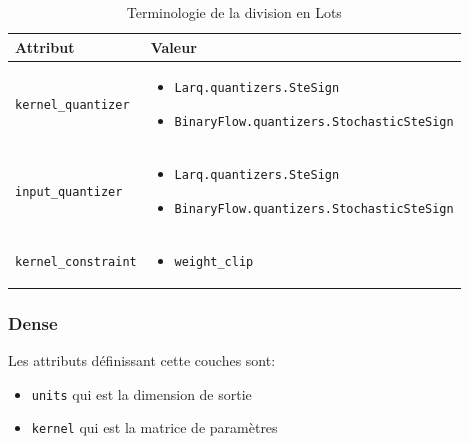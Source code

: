 \begin{table}[ht]
	\centering
	\begin{tabularx}{\textwidth}{| p{3.5cm} | X |}
		\hline
		Attribut & Valeur \\
		\hline
		 \texttt{kernel\_quantizer} & \begin{itemize}
		 	\item \texttt{Larq.quantizers.SteSign}
		 	\item \texttt{BinaryFlow.quantizers.StochasticSteSign}
		 \end{itemize}  \\ 
		\hline
		\texttt{input\_quantizer} & \begin{itemize}
			\item \texttt{Larq.quantizers.SteSign}
			\item \texttt{BinaryFlow.quantizers.StochasticSteSign}
		\end{itemize}  \\ 
		\hline 
		\texttt{kernel\_constraint} & \begin{itemize}
			\item \texttt{weight\_clip}
		\end{itemize}  \\ 
		\hline
	\end{tabularx}
	\caption{Terminologie de la division en Lots}
	\label{table:BinaryNetInitialisation}
\end{table}
\FloatBarrier
\subsubsection{Dense}
Les attributs définissant cette couches sont:
\begin{itemize}
	\item \texttt{units} qui est la dimension de sortie
	\item \texttt{kernel} qui est la matrice de paramètres
\end{itemize}
